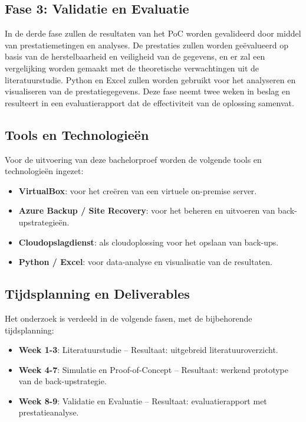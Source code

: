 \subsection{Fase 3: Validatie en Evaluatie}
In de derde fase zullen de resultaten van het PoC worden gevalideerd door middel van prestatiemetingen en analyses. De prestaties zullen worden geëvalueerd op basis van de herstelbaarheid en veiligheid van de gegevens, en er zal een vergelijking worden gemaakt met de theoretische verwachtingen uit de literatuurstudie. Python en Excel zullen worden gebruikt voor het analyseren en visualiseren van de prestatiegegevens. Deze fase neemt twee weken in beslag en resulteert in een evaluatierapport dat de effectiviteit van de oplossing samenvat.

\subsection{Tools en Technologieën}
Voor de uitvoering van deze bachelorproef worden de volgende tools en technologieën ingezet:
\begin{itemize}
    \item \textbf{VirtualBox}: voor het creëren van een virtuele on-premise server.
    \item \textbf{Azure Backup / Site Recovery}: voor het beheren en uitvoeren van back-upstrategieën.
    \item \textbf{Cloudopslagdienst}: als cloudoplossing voor het opslaan van back-ups.
    \item \textbf{Python / Excel}: voor data-analyse en visualisatie van de resultaten.
\end{itemize}

\subsection{Tijdsplanning en Deliverables}
Het onderzoek is verdeeld in de volgende fasen, met de bijbehorende tijdsplanning:
\begin{itemize}
    \item \textbf{Week 1-3}: Literatuurstudie – Resultaat: uitgebreid literatuuroverzicht.
    \item \textbf{Week 4-7}: Simulatie en Proof-of-Concept – Resultaat: werkend prototype van de back-upstrategie.
    \item \textbf{Week 8-9}: Validatie en Evaluatie – Resultaat: evaluatierapport met prestatieanalyse.
\end{itemize}


